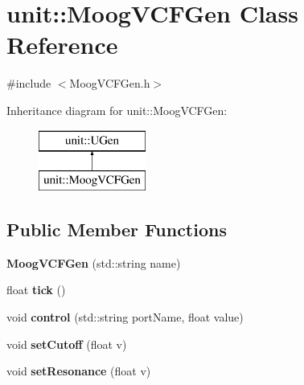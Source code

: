 \hypertarget{classunit_1_1MoogVCFGen}{\section{unit\-:\-:Moog\-V\-C\-F\-Gen Class Reference}
\label{classunit_1_1MoogVCFGen}
}


{\ttfamily \#include $<$Moog\-V\-C\-F\-Gen.\-h$>$}

Inheritance diagram for unit\-:\-:Moog\-V\-C\-F\-Gen\-:\begin{figure}[H]
\begin{center}
\leavevmode
\includegraphics[height=2.000000cm]{classunit_1_1MoogVCFGen}
\end{center}
\end{figure}
\subsection*{Public Member Functions}
\begin{DoxyCompactItemize}
\item 
\hypertarget{classunit_1_1MoogVCFGen_a7c93093d236bb363567929178f40a7a0}{{\bfseries Moog\-V\-C\-F\-Gen} (std\-::string name)}\label{classunit_1_1MoogVCFGen_a7c93093d236bb363567929178f40a7a0}

\item 
\hypertarget{classunit_1_1MoogVCFGen_a949c02a370ff5ce83b6dcf9a87eafba0}{float {\bfseries tick} ()}\label{classunit_1_1MoogVCFGen_a949c02a370ff5ce83b6dcf9a87eafba0}

\item 
\hypertarget{classunit_1_1MoogVCFGen_acedc61969800d26d1d5345fd23ea22c7}{void {\bfseries control} (std\-::string port\-Name, float value)}\label{classunit_1_1MoogVCFGen_acedc61969800d26d1d5345fd23ea22c7}

\item 
\hypertarget{classunit_1_1MoogVCFGen_a047c043cf3fcf1ac972bc088fa86f6f3}{void {\bfseries set\-Cutoff} (float v)}\label{classunit_1_1MoogVCFGen_a047c043cf3fcf1ac972bc088fa86f6f3}

\item 
\hypertarget{classunit_1_1MoogVCFGen_a9a0c38cd5912e817e89bed1b69eb0e39}{void {\bfseries set\-Resonance} (float v)}\label{classunit_1_1MoogVCFGen_a9a0c38cd5912e817e89bed1b69eb0e39}

\end{DoxyCompactItemize}
